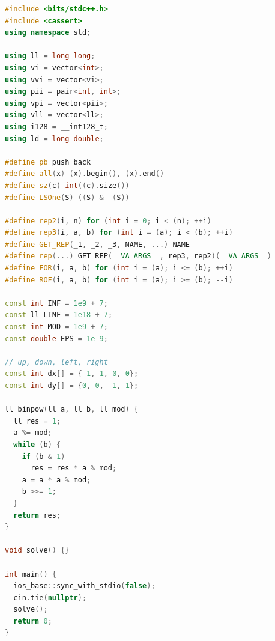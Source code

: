 \begin{lstlisting}[language=C++]
#include <bits/stdc++.h>
#include <cassert>
using namespace std;

using ll = long long;
using vi = vector<int>;
using vvi = vector<vi>;
using pii = pair<int, int>;
using vpi = vector<pii>;
using vll = vector<ll>;
using i128 = __int128_t;
using ld = long double;

#define pb push_back
#define all(x) (x).begin(), (x).end()
#define sz(c) int((c).size())
#define LSOne(S) ((S) & -(S))

#define rep2(i, n) for (int i = 0; i < (n); ++i)
#define rep3(i, a, b) for (int i = (a); i < (b); ++i)
#define GET_REP(_1, _2, _3, NAME, ...) NAME
#define rep(...) GET_REP(__VA_ARGS__, rep3, rep2)(__VA_ARGS__)
#define FOR(i, a, b) for (int i = (a); i <= (b); ++i)
#define ROF(i, a, b) for (int i = (a); i >= (b); --i)

const int INF = 1e9 + 7;
const ll LINF = 1e18 + 7;
const int MOD = 1e9 + 7;
const double EPS = 1e-9;

// up, down, left, right
const int dx[] = {-1, 1, 0, 0};
const int dy[] = {0, 0, -1, 1};

ll binpow(ll a, ll b, ll mod) {
  ll res = 1;
  a %= mod;
  while (b) {
    if (b & 1)
      res = res * a % mod;
    a = a * a % mod;
    b >>= 1;
  }
  return res;
}

void solve() {}

int main() {
  ios_base::sync_with_stdio(false);
  cin.tie(nullptr);
  solve();
  return 0;
}
\end{lstlisting}
